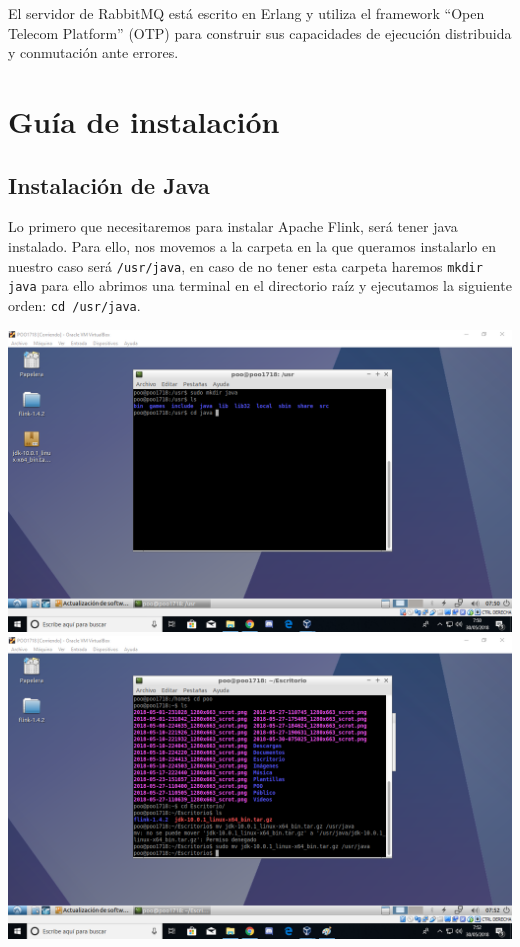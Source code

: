 \documentclass[12pt,letterpaper]{article}
\begin{document}
El servidor de RabbitMQ está escrito en Erlang y utiliza el framework ``Open Telecom Platform'' (OTP) para construir sus capacidades de ejecución distribuida y conmutación ante errores.


\section{Guía de instalación}
\subsection{Instalación de Java}
Lo primero que necesitaremos para instalar Apache Flink, será tener java instalado. Para ello, nos movemos a la carpeta en la que queramos instalarlo en nuestro caso será \texttt{/usr/java}, en caso de no tener esta carpeta haremos \texttt{mkdir java} para ello abrimos una terminal en el directorio raíz y ejecutamos la siguiente orden: \texttt{cd /usr/java}.
\begin{center}
	\includegraphics[scale=0.5]{1.png}\\
	
	\includegraphics[scale=0.5]{2.png}
\end{center}
\end{document}
